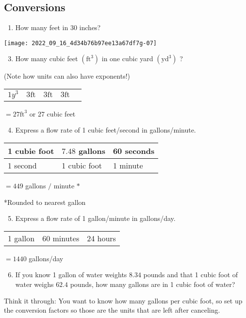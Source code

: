 \begin{enumerate}
\section{Conversions}
\begin{enumerate}
  \item How many feet in 30 inches?
\end{enumerate}
\texttt{[image: 2022\_09\_16\_4d34b76b97ee13a67df7g-07]}

\begin{enumerate}
  \setcounter{enumi}{2}
  \item How many cubic feet $\left(\mathrm{ft}^{3}\right)$ in one cubic yard $\left(\mathrm{yd}^{3}\right)$ ?
\end{enumerate}
(Note how units can also have exponents!)

\begin{tabular}{l|l|l|l|l}
$1 y^{3}$ & $3 \mathrm{ft}$ & $3 \mathrm{ft}$ & $3 \mathrm{ft}$ \\
\end{tabular}$=27 \mathrm{ft}^{3}$ or 27 cubic feet

\begin{enumerate}
  \setcounter{enumi}{3}
  \item Express a flow rate of 1 cubic feet/second in gallons/minute.
\end{enumerate}
\begin{tabular}{l|l|l}
1 cubie foot & $7.48$ gallons & 60 seconds \\
\hline
1 second & 1 cubic foot & 1 minute \\
\hline
\end{tabular}$=449$ gallons $/$ minute $*$

*Rounded to nearest gallon

\begin{enumerate}
  \setcounter{enumi}{4}
  \item Express a flow rate of 1 gallon/minute in gallons/day.
\end{enumerate}
\begin{tabular}{l|l|l}
1 gallon & 60 minutes & 24 hours \\
\end{tabular}$=1440$ gallons/day

\begin{enumerate}
  \setcounter{enumi}{5}
  \item If you know 1 gallon of water weights $8.34$ pounds and that 1 cubic foot of water weighs $62.4$ pounds, how many gallons are in 1 cubic foot of water?
\end{enumerate}
Think it through: You want to know how many gallons per cubic foot, so set up the conversion factors so those are the units that are left after canceling.


\end{enumerate}
